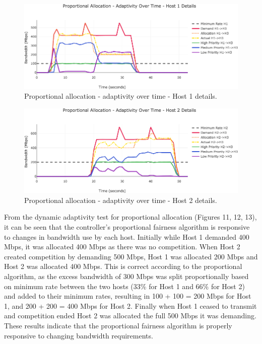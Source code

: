 \documentclass[accepted,single]{gipaper}
\begin{document}
\begin{figure}
	\centering
	\includegraphics[width=6in]{figs/dbap_ot_udp_h1.png}
	\caption{ Proportional allocation - adaptivity over time - Host 1 details. } \label{dpap_ot_h1}
\end{figure}

\begin{figure}
	\centering
	\includegraphics[width=6in]{figs/dbap_ot_udp_h2.png}
	\caption{ Proportional allocation - adaptivity over time - Host 2 details. } \label{dbap_ot_h2}
\end{figure}

From the dynamic adaptivity test for proportional allocation (Figures 11, 12, 13), it can be seen that the controller's proportional fairness algorithm is responsive to changes in bandwidth use by each host. Initially while Host 1 demanded 400 Mbps, it was allocated 400 Mbps as there was no competition. When Host 2 created competition by demanding 500 Mbps, Host 1 was allocated 200 Mbps and Host 2 was allocated 400 Mbps. This is correct according to the proportional algorithm, as the excess bandwidth of 300 Mbps was split proportionally based on minimum rate between the two hosts (33\% for Host 1 and 66\% for Host 2) and added to their minimum rates, resulting in 100 + 100 = 200 Mbps for Host 1, and 200 + 200 = 400 Mbps for Host 2. Finally when Host 1 ceased to transmit and competition ended Host 2 was allocated the full 500 Mbps it was demanding. These results indicate that the proportional fairness algorithm is properly responsive to changing bandwidth requirements.
\end{document}
